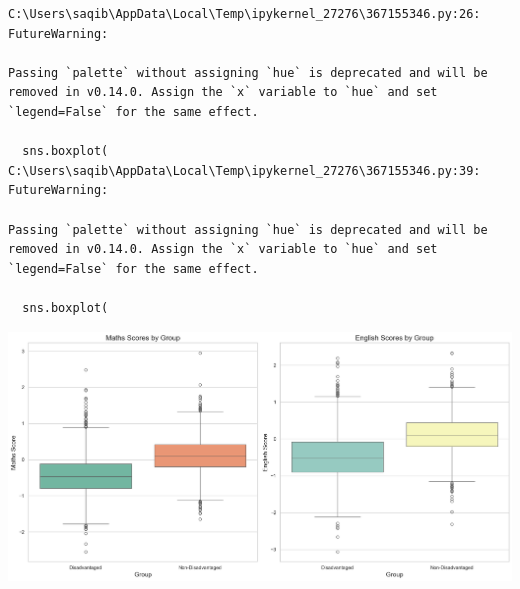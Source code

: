 \documentclass[
  letterpaper,
  DIV=11,
  numbers=noendperiod]{scrartcl}
\begin{document}
\begin{verbatim}
C:\Users\saqib\AppData\Local\Temp\ipykernel_27276\367155346.py:26: FutureWarning: 

Passing `palette` without assigning `hue` is deprecated and will be removed in v0.14.0. Assign the `x` variable to `hue` and set `legend=False` for the same effect.

  sns.boxplot(
C:\Users\saqib\AppData\Local\Temp\ipykernel_27276\367155346.py:39: FutureWarning: 

Passing `palette` without assigning `hue` is deprecated and will be removed in v0.14.0. Assign the `x` variable to `hue` and set `legend=False` for the same effect.

  sns.boxplot(
\end{verbatim}

\includegraphics{P4DS_A2_Data_Analysis_Project_files/figure-pdf/cell-65-output-2.png}
\end{document}
